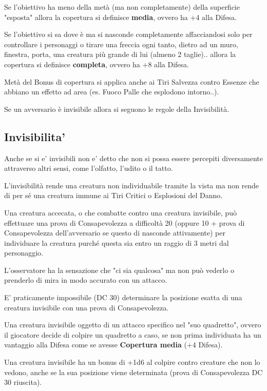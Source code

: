 \documentclass[a4paper,11pt,twoside,openany]{book}
\begin{document}
Se l'obiettivo ha meno della metà (ma non completamente) della superficie "esposta" allora la copertura si definisce \textbf{media}, ovvero ha +4 alla Difesa.

Se l'obiettivo si sa dove è ma si nasconde completamente affacciandosi solo per controllare i personaggi o tirare una freccia ogni tanto, dietro ad un muro, finestra, porta, una creatura più grande di lui (almeno 2 taglie).. allora la copertura si definisce \textbf{completa}, ovvero ha +8 alla Difesa.

Metà del Bonus di copertura si applica anche ai Tiri Salvezza contro Essenze che abbiano un effetto ad area (es. Fuoco Palle che esplodono intorno..).

Se un avversario è invisibile allora si seguono le regole della Invisibilità.

\subsection{Invisibilita'}

\label{invisibilita}

Anche se si e' invisibili non e' detto che non si possa essere percepiti diversamente attraverso altri sensi, come l'olfatto, l'udito o il tatto.

L'invisibilità rende una creatura non individuabile tramite la vista ma non rende di per sé una creatura immune ai Tiri Critici o Esplosioni del Danno.

Una creatura accecata, o che combatte contro una creatura invisibile, può effettuare una prova di Consapevolezza a difficoltà 20 (oppure 10 + prova di Consapevolezza dell'avversario se questo di nasconde attivamente) per individuare la creatura purché questa sia entro un raggio di 3 metri dal personaggio.

L'osservatore ha la sensazione che "ci sia qualcosa" ma non può vederlo o prenderlo di mira in modo accurato con un attacco.

E' praticamente impossibile (DC 30) determinare la posizione esatta di una creatura invisibile con una prova di Consapevolezza.

Una creatura invisibile oggetto di un attacco specifico nel "suo quadretto", ovvero il giocatore decide di colpire un quadretto a caso, se non prima individuata ha un vantaggio alla Difesa come se avesse \textbf{Copertura media} (+4 Difesa).

Una creatura invisibile ha un bonus di +1d6 al colpire contro creature che non lo vedono, anche se la sua posizione viene determinata (prova di Consapevolezza DC 30 riuscita).
\end{document}
